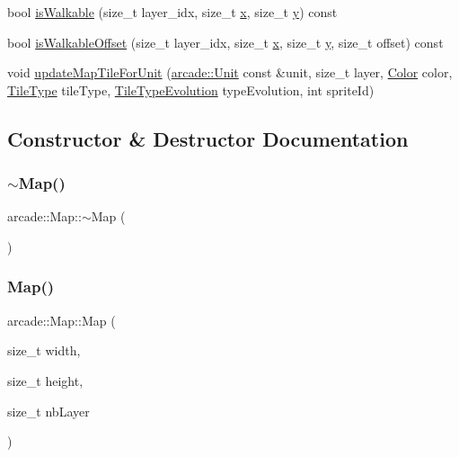 \begin{DoxyCompactItemize}
bool \hyperlink{classarcade_1_1_map_a928573e629508a21455fdddf7298bcb4}{is\+Walkable} (size\+\_\+t layer\+\_\+idx, size\+\_\+t \hyperlink{include_2_protocol_8hpp_a4dde988b1b2adba65ae3efa69f65d960}{x}, size\+\_\+t \hyperlink{include_2_protocol_8hpp_ab0580f504a7428539be299fa71565f30}{y}) const
\item 
bool \hyperlink{classarcade_1_1_map_a15d5bbda533aab8362cac28a3f675d27}{is\+Walkable\+Offset} (size\+\_\+t layer\+\_\+idx, size\+\_\+t \hyperlink{include_2_protocol_8hpp_a4dde988b1b2adba65ae3efa69f65d960}{x}, size\+\_\+t \hyperlink{include_2_protocol_8hpp_ab0580f504a7428539be299fa71565f30}{y}, size\+\_\+t offset) const
\item 
void \hyperlink{classarcade_1_1_map_aafef74905482be652a9dc94f4b0c962e}{update\+Map\+Tile\+For\+Unit} (\hyperlink{classarcade_1_1_unit}{arcade\+::\+Unit} const \&unit, size\+\_\+t layer, \hyperlink{unionarcade_1_1_color}{Color} color, \hyperlink{namespacearcade_a61ba576694ea309cdf2b4b66902408ca}{Tile\+Type} tile\+Type, \hyperlink{namespacearcade_a2e0a64a64203f78c9efb84a1475a8cf4}{Tile\+Type\+Evolution} type\+Evolution, int sprite\+Id)
\end{DoxyCompactItemize}


\subsection{Constructor \& Destructor Documentation}
\mbox{\label{classarcade_1_1_map_a5a07c82ff294b43e2091ad54f7a432f0}} 
\subsubsection{\texorpdfstring{$\sim$\+Map()}{~Map()}}
{\footnotesize\ttfamily arcade\+::\+Map\+::$\sim$\+Map (\begin{DoxyParamCaption}{ }\end{DoxyParamCaption})\hspace{0.3cm}{\ttfamily [virtual]}}

\mbox{\label{classarcade_1_1_map_afc77786cf678dbf7fcf441889968ce13}} 
\subsubsection{\texorpdfstring{Map()}{Map()}}
{\footnotesize\ttfamily arcade\+::\+Map\+::\+Map (\begin{DoxyParamCaption}\item[{size\+\_\+t}]{width,  }\item[{size\+\_\+t}]{height,  }\item[{size\+\_\+t}]{nb\+Layer }\end{DoxyParamCaption})}



